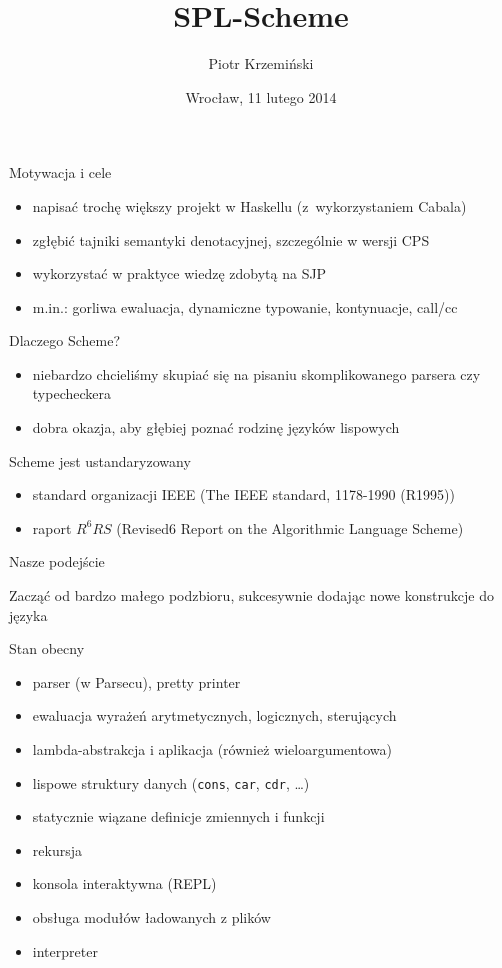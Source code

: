 \documentclass[12pt,serif]{beamer}
\title{SPL-Scheme}
\author{Piotr Krzemiński}
\date{Wrocław, 11 lutego 2014}
\begin{document}
\begin{frame}
\titlepage
\end{frame}


\begin{frame}{Motywacja i cele}
\begin{itemize}
  \item napisać trochę większy projekt w Haskellu (z~wykorzystaniem Cabala)
  \item zgłębić tajniki semantyki denotacyjnej, szczególnie w wersji CPS
  \item wykorzystać w praktyce wiedzę zdobytą na SJP
  \item m.in.: gorliwa ewaluacja, dynamiczne typowanie, kontynuacje, call/cc
\end{itemize}
\end{frame}

\begin{frame}{Dlaczego Scheme?}
\begin{itemize}
  \item niebardzo chcieliśmy skupiać się na pisaniu skomplikowanego
        parsera czy typecheckera
  \item dobra okazja, aby głębiej poznać rodzinę języków lispowych
\end{itemize}
\end{frame}

\begin{frame}{Scheme jest ustandaryzowany}
\begin{itemize}
  \item standard organizacji IEEE (The IEEE standard, 1178-1990 (R1995))
  \item raport $R^6RS$ (Revised6 Report on the Algorithmic Language Scheme)
\end{itemize}
\end{frame}

\begin{frame}{Nasze podejście}
\begin{center}
Zacząć od bardzo małego podzbioru, sukcesywnie dodając
nowe konstrukcje do języka
\end{center}
\end{frame}

\begin{frame}{Stan obecny}
\begin{itemize}
  \item parser (w Parsecu), pretty printer
  \item ewaluacja wyrażeń arytmetycznych, logicznych, sterujących
  \item lambda-abstrakcja i aplikacja (również wieloargumentowa)
  \item lispowe struktury danych (\texttt{cons}, \texttt{car}, \texttt{cdr}, \ldots)
  \item statycznie wiązane definicje zmiennych i funkcji
  \item rekursja
  \item konsola interaktywna (REPL)
  \item obsługa modułów ładowanych z plików
  \item interpreter
\end{itemize}
\end{frame}
\end{document}

